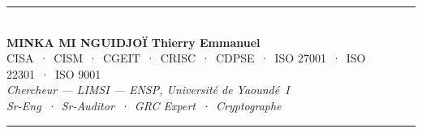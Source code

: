 \documentclass[12pt, a4paper, twoside, openright]{book}
\begin{document}
\vfill

\begin{center}
    {\color{CouleurAccent}\rule{0.7\linewidth}{1.2pt}}\\[1.2ex]
    {\color{white}\large\bfseries MINKA MI NGUIDJOÏ Thierry Emmanuel}\\[0.4ex]
    {\color{white!80!gray}\small
        CISA~·~CISM~·~CGEIT~·~CRISC~·~CDPSE~·~ISO 27001~·~ISO 22301~·~ISO 9001}\\[0.3ex]
    {\color{white!70!gray}\footnotesize\itshape
        Chercheur — LIMSI — ENSP, Université de Yaoundé~I}\\[0.3ex]
    {\color{white!70!gray}\footnotesize\itshape
        Sr-Eng~·~Sr-Auditor~·~GRC Expert~·~Cryptographe}\\[1.2ex]
    {\color{CouleurAccent}\rule{0.7\linewidth}{1.2pt}}
\end{center}

\vspace{1cm}

\afterpage{\nopagecolor}
\end{document}
